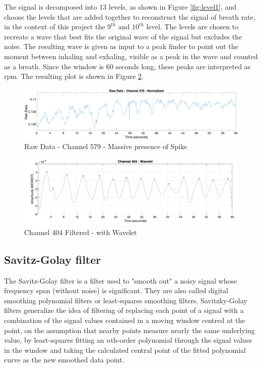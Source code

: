 The signal is decomposed into 13 levels, as shown in Figure \ref{fig:level1}, and choose the levels that are added together to reconstruct the signal of breath rate, in the context of this project the $9^{th}$ and $10^{th}$ level. The levels are chosen to recreate a wave that best fits the original wave of the signal but excludes the noise.
The resulting wave is given as input to a peak finder to point out the moment between inhaling and exhaling, visible as a peak in the wave and counted as a breath. Since the window is 60 seconds long, these peaks are interpreted as rpm. The resulting plot is shown in Figure \ref{fig:404Filt}.
\begin{figure}[H]
    \centering
    \includegraphics[width=\textwidth]{img/579.pdf}
    \caption{Raw Data - Channel 579 - Massive presence of Spike}
    \label{fig:404}
\end{figure}

\begin{figure}[H]
    \centering
    \includegraphics[width=\textwidth]{img/404_wave.jpg}
    \caption{Channel 404 Filtered - with Wavelet}
    \label{fig:404Filt}
\end{figure}


\subsection{Savitz-Golay filter} \label{sg}


The Savitz-Golay filter is a filter used to "smooth out" a noisy signal whose frequency span (without noise) is significant. 
They are also called digital smoothing polynomial filters or least-squares smoothing filters. 
Savitzky-Golay filters generalize the idea of filtering of replacing each point of a signal with a combination of the signal values contained in a moving window centred at the point, on the assumption that nearby points measure nearly the same underlying value, by least-squares fitting an $n$th-order polynomial through the signal values in the window and taking the calculated central point of the fitted polynomial curve as the new smoothed data point.

